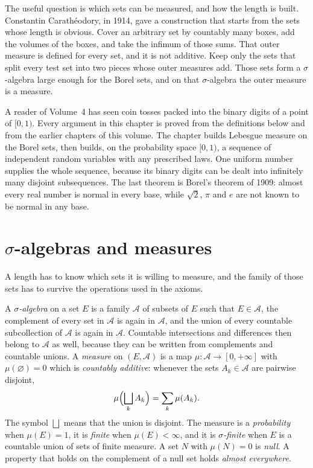 The useful question is which sets can be measured, and how the length is built.
Constantin Carath\'eodory, in 1914, gave a construction that starts from the sets whose length is obvious.
Cover an arbitrary set by countably many boxes, add the volumes of the boxes, and take the infimum of those sums.
That outer measure is defined for every set, and it is not additive.
Keep only the sets that split every test set into two pieces whose outer measures add.
Those sets form a $\sigma$-algebra large enough for the Borel sets, and on that $\sigma$-algebra the outer measure is a measure.


A reader of Volume~4 has seen coin tosses packed into the binary digits of a point of $[0,1)$.
Every argument in this chapter is proved from the definitions below and from the earlier chapters of this volume.
The chapter builds Lebesgue measure on the Borel sets, then builds, on the probability space $[0,1)$, a sequence of independent random variables with any prescribed laws.
One uniform number supplies the whole sequence, because its binary digits can be dealt into infinitely many disjoint subsequences.
The last theorem is Borel's theorem of 1909: almost every real number is normal in every base, while $\sqrt2$, $\pi$ and $e$ are not known to be normal in any base.

\section{\texorpdfstring{$\sigma$}{Sigma}-algebras and measures}

A length has to know which sets it is willing to measure, and the family of those sets has to survive the operations used in the axioms.

\begin{definition}
A \emph{$\sigma$-algebra} on a set $E$ is a family $\mathcal A$ of subsets of $E$ such that $E\in\mathcal A$, the complement of every set in $\mathcal A$ is again in $\mathcal A$, and the union of every countable subcollection of $\mathcal A$ is again in $\mathcal A$.
Countable intersections and differences then belong to $\mathcal A$ as well, because they can be written from complements and countable unions.
A \emph{measure} on $(E,\mathcal A)$ is a map $\mu:\mathcal A\to[0,+\infty]$ with $\mu(\varnothing)=0$ which is \emph{countably additive}: whenever the sets $A_k\in\mathcal A$ are pairwise disjoint,
\[
\mu\Bigl(\bigsqcup_k A_k\Bigr)=\sum_k\mu(A_k).
\]
The symbol $\bigsqcup$ means that the union is disjoint.
The measure is a \emph{probability} when $\mu(E)=1$, it is \emph{finite} when $\mu(E)<\infty$, and it is \emph{$\sigma$-finite} when $E$ is a countable union of sets of finite measure.
A set $N$ with $\mu(N)=0$ is \emph{null}.
A property that holds on the complement of a null set holds \emph{almost everywhere}.
\end{definition}

